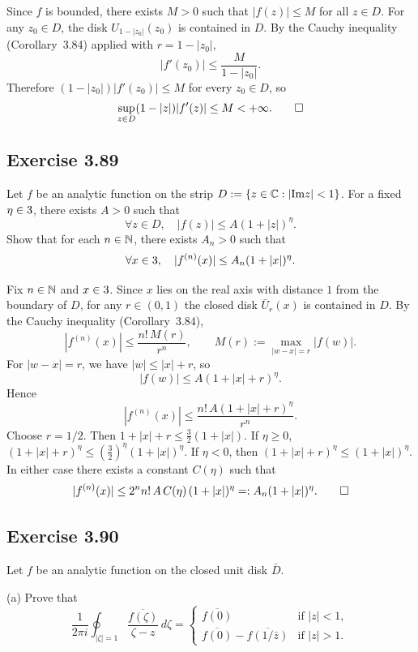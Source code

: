\documentclass{article}
\begin{document}
\begin{solution}
  Since $f$ is bounded, there exists $M > 0$ such that
  $|f(z)| \le M$ for all $z \in D$.
  For any $z_0 \in D$, the disk
  $U_{1-|z_0|}(z_0)$ is contained in $D$.
  By the Cauchy inequality (Corollary~3.84) applied with
  $r = 1 - |z_0|$,
  \[
    |f'(z_0)| \le \frac{M}{1-|z_0|}.
  \]
  Therefore $(1-|z_0|)|f'(z_0)| \le M$ for every $z_0 \in D$, so
  \[
    \sup_{z \in D}(1-|z|)|f'(z)| \le M < +\infty.\qedhere
  \]
\end{solution}

\subsection{Exercise 3.89}

Let $f$ be an analytic function on the strip
$D := \{z \in \mathbb{C} : |\mathrm{Im} z| < 1\}$.
For a fixed $\eta \in 3$, there exists $A > 0$ such that
\[
  \forall z \in D,\quad |f(z)| \le A(1 + |z|)^\eta.
\]
Show that for each $n \in \mathbb{N}$, there exists $A_n > 0$ such that
\[
  \forall x \in 3,\quad |f^{(n)}(x)| \le A_n(1 + |x|)^\eta.
\]

\begin{solution}
  Fix $n \in \mathbb{N}$ and $x \in 3$.
  Since $x$ lies on the real axis with distance $1$ from the
  boundary of $D$, for any $r \in (0,1)$ the closed disk
  $\bar{U}_r(x)$ is contained in $D$.
  By the Cauchy inequality (Corollary~3.84),
  \[
    |f^{(n)}(x)| \le \frac{n!\,M(r)}{r^n},
    \qquad M(r) := \max_{|w-x|=r}|f(w)|.
  \]
  For $|w-x| = r$, we have $|w| \le |x| + r$, so
  \[
    |f(w)| \le A(1+|x|+r)^\eta.
  \]
  Hence
  \[
    |f^{(n)}(x)| \le \frac{n!\,A(1+|x|+r)^\eta}{r^n}.
  \]
  Choose $r = 1/2$.  Then $1+|x|+r \le \frac{3}{2}(1+|x|)$.
  If $\eta \ge 0$,
  $(1+|x|+r)^\eta \le (\frac{3}{2})^\eta(1+|x|)^\eta$.
  If $\eta < 0$, then $(1+|x|+r)^\eta \le (1+|x|)^\eta$.
  In either case there exists a constant $C(\eta)$ such that
  \[
    |f^{(n)}(x)| \le 2^n n!\,A\,C(\eta)\,(1+|x|)^\eta
    =: A_n(1+|x|)^\eta.\qedhere
  \]
\end{solution}

\subsection{Exercise 3.90}

Let $f$ be an analytic function on the closed unit disk $\bar{D}$.

(a) Prove that
\[
  \frac{1}{2\pi i}\oint_{|\zeta|=1}
  \frac{\overline{f(\zeta)}}{\zeta - z}\,d\zeta
  =
  \begin{cases}
    \overline{f(0)} & \text{if } |z| < 1,\\
    \overline{f(0)} - \overline{f(1/\bar{z})} & \text{if } |z| > 1.
  \end{cases}
\]
\end{document}
